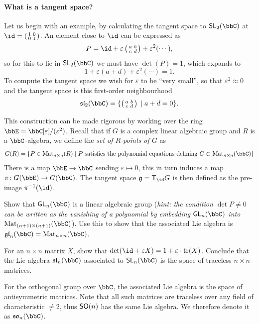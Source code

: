 \paragraph{What is a tangent space?} Let us begin with an example, by
calculating the tangent space to $\sf{SL}_2(\bbC)$ at $\id=\mat{1&0 \\ 0&1}$. 
An element close to $\id$ can be expressed as \[P=\id + \varepsilon \mat{a & b
\\ c &  d} + \varepsilon^2 ( \cdots ),\]
so for this to lie in $\sf{SL}_2(\bbC)$ we must have $\det(P)=1$, which expands
to
\[1+\varepsilon(a+d)+\varepsilon^2(\cdots )=1.\]
To compute the tangent space we wish for $\varepsilon$ to be ``very small'', so
that $\varepsilon^2\approx 0$ and the tangent space is this first-order neighbourhood
\[\sl_2(\bbC) = \{\mat{a&b \\ c&d} \;|\; a+d =0\}.\] 

This construction can be made rigorous by working over the ring
$\bbE=\bbC[\varepsilon]/(\varepsilon^2)$. Recall that if $G$ is a complex linear
algebraic group and $R$ is a $\bbC$-algebra, we define the \emph{set of
$R$-points of $G$} as 
\[
    G(R)=\{
        P\in \Mat{n}(R) \;|\; 
        P\text{ satisfies the polynomial equations defining } 
        G\subset \Mat{n}(\bbC)
    \}
\]
There is a map $\bbE\to \bbC$ sending $\varepsilon\mapsto 0$, this in turn
induces a map $\pi\colon G(\bbE)\to G(\bbC)$. The tangent space $\frakg=\sf{T}_\id G$
is then defined as the pre-image $\pi^{-1}(\id)$.


\begin{exercise}
    Show that $\sf{GL}_n(\bbC)$ is a linear algebraic group (\emph{hint: the condition
    $\det P \neq 0$ can be written as the vanishing of a polynomial by embedding
    $\sf{GL}_n(\bbC)$ into $\Mat{(n+1)}(\bbC)$}). Use this to show that the
    associated Lie algebra is $\mathfrak{gl}_n(\bbC) =\Mat{n}(\bbC)$.
\end{exercise}
 
\begin{exercise}
    For an $n\times n$ matrix $X$, show that $\det(\id + \varepsilon X) = 1 +
    \varepsilon \cdot \text{tr}(X)$. Conclude that the Lie algebra $\sl_n(\bbC)$
    associated to $\sf{SL}_n(\bbC)$ is the space of traceless $n\times n$
    matrices. 
\end{exercise}

\begin{example}
    For the orthogonal group over $\bbC$, the associated Lie algebra is
    the space of antisymmetric matrices. Note that all such matrices are
    traceless over any field of characteristic $\neq 2$, thus $\sf{SO}(n)$ has
    the same Lie algebra. We therefore denote it as $\so_n(\bbC)$.
\end{example}

